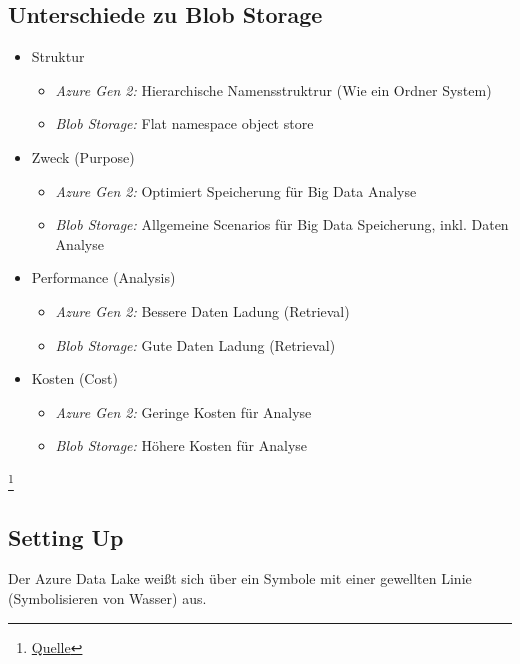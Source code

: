 \subsection{Unterschiede zu Blob Storage}\label{subsec_Unterschied_Blob_Storage}
\begin{itemize}
	\item Struktur
			\begin{itemize}
				\item \textit{Azure Gen 2:} Hierarchische Namensstruktrur (Wie ein Ordner System)
				\item \textit{Blob Storage:} Flat namespace object store
			\end{itemize}
	\item Zweck (Purpose)
			\begin{itemize}
				\item \textit{Azure Gen 2:} Optimiert Speicherung für Big Data Analyse
				\item \textit{Blob Storage:} Allgemeine Scenarios für Big Data Speicherung, inkl. Daten Analyse
			\end{itemize}
	\item Performance (Analysis)
			\begin{itemize}
				\item \textit{Azure Gen 2:} Bessere Daten Ladung (Retrieval)
				\item \textit{Blob Storage:} Gute Daten Ladung (Retrieval)
			\end{itemize}
	\item Kosten (Cost)
			\begin{itemize}
				\item \textit{Azure Gen 2:} Geringe Kosten für Analyse
				\item \textit{Blob Storage:} Höhere Kosten für Analyse
			\end{itemize}
\end{itemize}\footnote{
	\href{https://medium.com/awesome-azure/azure-difference-between-azure-blob-storage-and-azure-data-lake-storage-comparison-azure-blob-vs-adls-gen2-81af5ef2a6e1}{Quelle}
}

\subsection{Setting Up}
Der Azure Data Lake weißt sich über ein Symbole mit einer gewellten Linie (Symbolisieren von Wasser) aus.

